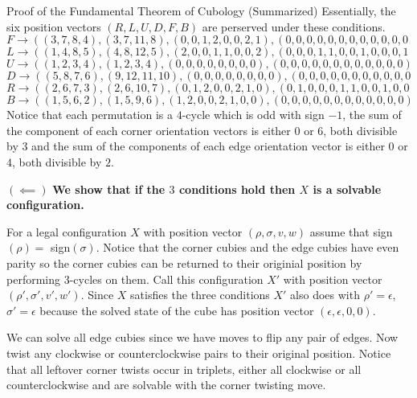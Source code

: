 \documentclass[final]{beamer}
\newlength{\colwidth}
\begin{document}
\begin{frame}[t]
\begin{columns}[t]
\begin{column}{\colwidth}
\begin{block}{Proof of the Fundamental Theorem of Cubology (Summarized)}
Essentially, the six position vectors $(R,L,U,D,F,B)$ are perserved under these conditions.
$$F \rightarrow ((3, 7, 8, 4), (3, 7, 11, 8), (0, 0, 1, 2, 0, 0, 2, 1), (0, 0, 0, 0, 0, 0, 0, 0, 0, 0, 0, 0))$$
$$L \rightarrow ((1 ,4,8,5),(4,8,12,5),(2, 0, 0, 1, 1, 0, 0, 2), (0, 0, 0, 1, 1, 0, 0, 1, 0, 0, 0, 1))$$
$$U \rightarrow ((1, 2, 3, 4), (1, 2, 3, 4), (0, 0, 0, 0, 0, 0, 0, 0), (0, 0, 0, 0, 0, 0, 0, 0, 0, 0, 0, 0))$$
$$D \rightarrow ((5, 8, 7, 6), (9, 12, 11, 10), (0, 0, 0, 0, 0, 0, 0, 0), (0, 0, 0, 0, 0, 0, 0, 0, 0, 0, 0, 0))$$
$$R \rightarrow ((2,6,7,3),(2,6,10,7),(0,1,2,0,0,2,1,0),(0,1,0,0,0,1,1,0,0,1,0,0))$$
$$B \rightarrow ((1, 5, 6, 2), (1, 5, 9, 6), (1, 2, 0, 0, 2, 1, 0, 0), (0, 0, 0, 0, 0, 0, 0, 0, 0, 0, 0, 0))$$
Notice that each permutation is a $4$-cycle which is odd with sign $-1$, the sum of the component of each corner orientation vectors is either $0$ or $6$, both divisible by $3$ and
the sum of the components of each edge orientation vector is either $0$ or $4$, both divisible by $2$.

$(\impliedby)$
\textbf{We show that if the $3$ conditions hold then $X$ is a solvable configuration.}

For a legal configuration $X$ with position vector $(\rho, \sigma, v, w)$ assume that sign$(\rho)=$ sign$(\sigma)$.
Notice that the corner cubies and the edge cubies have even parity so the corner cubies can be returned to their originial position by performing $3$-cycles on them.
Call this configuration $X'$ with position vector $(\rho', \sigma', v', w')$.
Since $X$ satisfies the three conditions $X'$ also does with $\rho' = \epsilon$, $\sigma' = \epsilon$ because the solved state of the cube has position vector $(\epsilon, \epsilon, 0 , 0)$.

We can solve all edge cubies since we have moves to flip any pair of edges.
Now twist any clockwise or counterclockwise pairs to their original position.
Notice that all leftover corner twists occur in triplets, either all clockwise or all counterclockwise and are solvable with the corner twisting move.


  \end{block}



\end{column}
\end{columns}
\end{frame}
\end{document}
